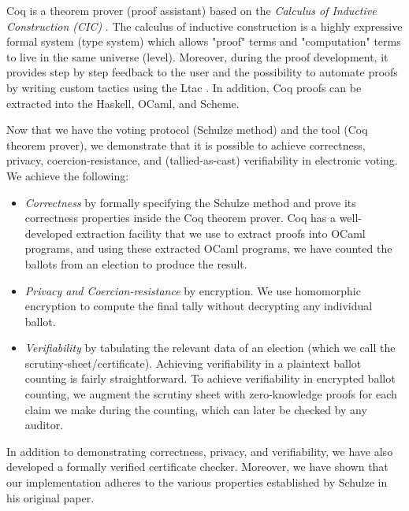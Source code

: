 Coq is a theorem prover (proof assistant) based on the \textit{Calculus of Inductive Construction (CIC)} 
\citep{Coquand:1988:CC:47724.47725} \citep{coquand1988inductively}. 
The calculus of inductive construction is a highly expressive formal system (type system) 
which allows "proof" terms and 
"computation" terms to live in the same universe (level). Moreover, during the proof development, 
it provides step by step feedback to the user and the possibility to automate proofs by 
writing custom tactics using the Ltac \citep{10.5555/1765236.1765246}. In addition, 
Coq proofs can be extracted into the  Haskell, OCaml, and Scheme.
 
Now that we have the voting protocol (Schulze method) and  the tool (Coq theorem prover), 
we demonstrate that it is possible to achieve correctness, privacy, coercion-resistance, and (tallied-as-cast) verifiability in 
electronic voting. We achieve the following:
\begin{itemize}
 \item \textit{Correctness} by formally specifying the Schulze method  and prove its correctness properties
  inside the Coq theorem prover. 
 Coq has a well-developed extraction facility that 
 we use to extract proofs into OCaml programs, and using these extracted OCaml programs, we 
 have counted the ballots from an election to produce the result. 
 \item \textit{Privacy and Coercion-resistance} by encryption. We use homomorphic encryption to compute the 
  final tally without decrypting any individual ballot. 
\item \textit{Verifiability} by tabulating the relevant data of an election (which we call the scrutiny-sheet/certificate).
   Achieving verifiability in a plaintext ballot counting is fairly straightforward. 
   To achieve verifiability in encrypted ballot counting, 
   we augment the scrutiny sheet with zero-knowledge proofs for each claim we make during the 
   counting, which can  later be checked by any auditor.  
\end{itemize}



In addition to demonstrating correctness, privacy, and verifiability, we have also developed a formally verified certificate 
checker. Moreover, we have shown that our implementation adheres to the various properties established by Schulze in 
his original paper. 

